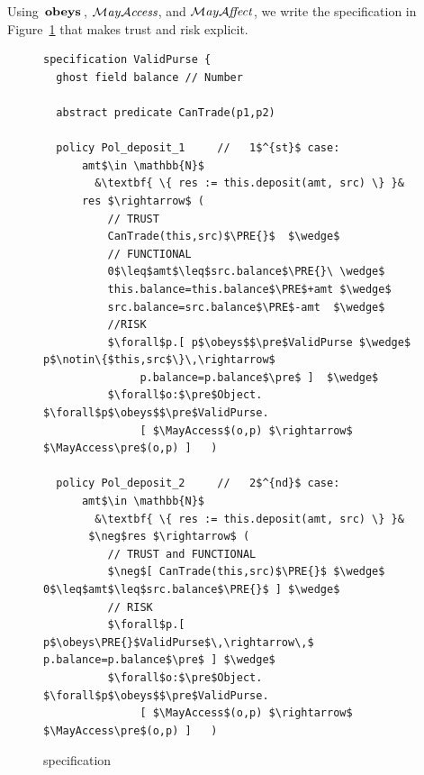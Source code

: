 

Using $\,\textbf{\textrm{obeys}}\,$, $\mathcal{M}\textrm{\textit{ay}}{\mathcal{A}}\textrm{\textit{ccess}}$, and $\mathcal{M}\textrm{\textit{ay}}{\mathcal{A}}\textrm{\textit{ffect}}$, we write the
  specification in Figure~\ref{fig:ValidPurse} that
makes  trust and risk explicit.

\begin{figure}[hbt]
\begin{lstlisting}[escapechar=&]
specification ValidPurse {
  ghost field balance // Number
  
  abstract predicate CanTrade(p1,p2)

  policy Pol_deposit_1     //   1$^{st}$ case:
      amt$\in \mathbb{N}$
        &\textbf{ \{ res := this.deposit(amt, src) \} }&
      res $\rightarrow$ (
          // TRUST
          CanTrade(this,src)$\PRE{}$  $\wedge$
          // FUNCTIONAL  
          0$\leq$amt$\leq$src.balance$\PRE{}\ \wedge$
          this.balance=this.balance$\PRE$+amt $\wedge$
          src.balance=src.balance$\PRE$-amt  $\wedge$
          //RISK
          $\forall$p.[ p$\obeys$$\pre$ValidPurse $\wedge$ p$\notin\{$this,src$\}\,\rightarrow$
               p.balance=p.balance$\pre$ ]  $\wedge$
          $\forall$o:$\pre$Object. $\forall$p$\obeys$$\pre$ValidPurse.
               [ $\MayAccess$(o,p) $\rightarrow$ $\MayAccess\pre$(o,p) ]   )

  policy Pol_deposit_2     //   2$^{nd}$ case:
      amt$\in \mathbb{N}$
        &\textbf{ \{ res := this.deposit(amt, src) \} }&
       $\neg$res $\rightarrow$ (
          // TRUST and FUNCTIONAL  
          $\neg$[ CanTrade(this,src)$\PRE{}$ $\wedge$ 0$\leq$amt$\leq$src.balance$\PRE{}$ ] $\wedge$
          // RISK
          $\forall$p.[ p$\obeys\PRE{}$ValidPurse$\,\rightarrow\,$ p.balance=p.balance$\pre$ ] $\wedge$
          $\forall$o:$\pre$Object. $\forall$p$\obeys$$\pre$ValidPurse.
               [ $\MayAccess$(o,p) $\rightarrow$ $\MayAccess\pre$(o,p) ]   )
\end{lstlisting}
\vspace*{-7mm}
\caption{ specification}
\label{fig:ValidPurse}
\end{figure}
%
\addtocounter{figure}{-1}
%
